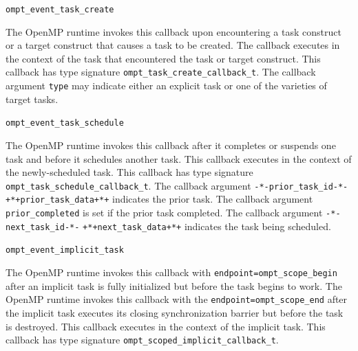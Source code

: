 \documentclass{article}
\newcommand{\descheader}[1]{{\needspace{3\baselineskip}\vspace{1em}\noindent \fbox{#1}}}
\providecommand{\DIFaddbegin}{} %
\providecommand{\DIFaddend}{} %
\providecommand{\DIFdelbegin}{} %
\providecommand{\DIFdelend}{} %
\begin{document}
\begin{description}

\item \lstinline|ompt_event_task_create|

The OpenMP runtime invokes this callback
upon encountering a task construct or a target construct that causes a task to be created. 
The callback executes in the context of
the task that encountered the task or target construct.
This callback has type signature \lstinline|ompt_task_create_callback_t|.
The callback argument \lstinline|type| may indicate either an explicit task or one of the varieties of target tasks.

\item \lstinline|ompt_event_task_schedule|

 The OpenMP runtime invokes this callback after it
 completes or suspends one task and before it schedules another task.  This
 callback executes in the context of the newly-scheduled task.  
   This callback has type signature \lstinline|ompt_task_schedule_callback_t|. 
  The callback argument \DIFdelbegin \lstinline|-*-prior_task_id-*-| %
\DIFdelend \DIFaddbegin\lstinline|+*+prior_task_data+*+| \DIFaddend indicates the prior task.
  The callback argument \lstinline|prior_completed| is set if the prior task completed.
  The callback argument \DIFdelbegin \lstinline|-*-next_task_id-*-| %
\DIFdelend \DIFaddbegin\lstinline|+*+next_task_data+*+| \DIFaddend indicates the task being scheduled. 

\item \lstinline|ompt_event_implicit_task|

      The OpenMP runtime invokes this callback with \lstinline|endpoint=|\lstinline|ompt_scope_begin| after an
   implicit task is fully initialized but before the task begins to work.
   The OpenMP runtime invokes this callback with the \lstinline|endpoint=|\lstinline|ompt_scope_end| after the implicit
   task executes its closing synchronization barrier but before
   the task is destroyed.
   This callback executes in the context of the implicit task.
     This callback has type signature \lstinline|ompt_scoped_implicit_callback_t|. 

\end{description}

\descheader{Target Regions}
\end{document}
